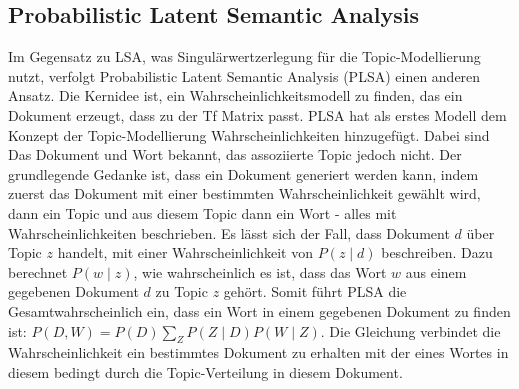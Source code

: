 \documentclass[german,version-2020-11]{uzl-thesis}
\begin{document}
\subsection{Probabilistic Latent Semantic Analysis}
Im Gegensatz zu LSA, was Singulärwertzerlegung für die Topic-Modellierung nutzt, verfolgt Probabilistic Latent Semantic Analysis (PLSA) einen anderen Ansatz. Die Kernidee ist, ein Wahrscheinlichkeitsmodell zu finden, das ein Dokument erzeugt, dass zu der Tf Matrix passt. PLSA hat als erstes Modell dem Konzept der Topic-Modellierung Wahrscheinlichkeiten hinzugefügt. Dabei sind Das Dokument und Wort bekannt, das assoziierte Topic jedoch nicht. Der grundlegende Gedanke ist, dass ein Dokument generiert werden kann, indem zuerst das Dokument mit einer bestimmten Wahrscheinlichkeit gewählt wird, dann ein Topic und aus diesem Topic dann ein Wort - alles mit Wahrscheinlichkeiten beschrieben. Es lässt sich der Fall, dass Dokument $d$ über Topic $z$ handelt, mit einer Wahrscheinlichkeit von $P(z \mid d)$ beschreiben. Dazu berechnet $P(w \mid z)$, wie wahrscheinlich es ist, dass das Wort $w$ aus einem gegebenen Dokument $d$ zu Topic $z$ gehört. Somit führt PLSA die Gesamtwahrscheinlich ein, dass ein Wort in einem gegebenen Dokument zu finden ist: $P(D,W) = P(D) \sum_{Z}{P(Z\mid D)P(W\mid Z)}$. Die Gleichung verbindet die Wahrscheinlichkeit ein bestimmtes Dokument zu erhalten mit der eines Wortes in diesem bedingt durch die Topic-Verteilung in diesem Dokument. 
\end{document}
